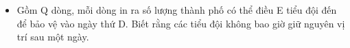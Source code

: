 \begin{itemize}
	\item     Gồm Q dòng, mỗi dòng in ra số lượng thành phố có thể điều E tiểu đội đến để bảo vệ vào ngày thứ D. Biết rằng các tiểu đội không bao giờ giữ nguyên vị trí sau một ngày.   
\end{itemize}